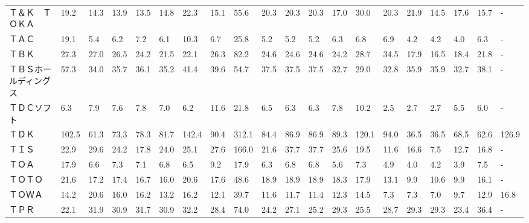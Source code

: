 \begin{tabular}{llllllllllllllllllll}
Ｔ＆Ｋ　ＴＯＫＡ        &   19.2 &   14.3 &      13.9 &      13.5 &       14.8 &    22.3 &    15.1 &     55.6 &    20.3 &    20.3 &   20.3 &   17.0 &    30.0 &    20.3 &    21.9 &   14.5 &   17.6 &    15.7 &      - \\
ＴＡＣ             &   19.1 &    5.4 &       6.2 &       7.2 &        6.1 &    10.3 &     6.7 &     25.8 &     5.2 &     5.2 &    5.2 &    6.3 &     6.8 &     6.9 &     4.2 &    4.2 &    4.0 &     6.3 &      - \\
ＴＢＫ             &   27.3 &   27.0 &      26.5 &      24.2 &       21.5 &    22.1 &    26.3 &     82.2 &    24.6 &    24.6 &   24.6 &   24.2 &    28.7 &    34.5 &    17.9 &   16.5 &   18.4 &    21.8 &      - \\
ＴＢＳホールディングス     &   57.3 &   34.0 &      35.7 &      36.1 &       35.2 &    41.4 &    39.6 &     54.7 &    37.5 &    37.5 &   37.5 &   32.7 &    29.0 &    32.8 &    35.9 &   35.9 &   32.7 &    38.1 &      - \\
ＴＤＣソフト          &    6.3 &    7.9 &       7.6 &       7.8 &        7.0 &     6.2 &    11.6 &     21.8 &     6.5 &     6.3 &    6.3 &    7.8 &    10.2 &     2.5 &     2.7 &    2.7 &    5.5 &     6.0 &      - \\
ＴＤＫ             &  102.5 &   61.3 &      73.3 &      78.3 &       81.7 &   142.4 &    90.4 &    312.1 &    84.4 &    86.9 &   86.9 &   89.3 &   120.1 &    94.0 &    36.5 &   36.5 &   68.5 &    62.6 &  126.9 \\
ＴＩＳ             &   22.9 &   29.6 &      24.2 &      17.8 &       24.0 &    25.1 &    27.6 &    166.0 &    21.6 &    37.7 &   37.7 &   25.6 &    19.5 &    11.6 &    16.6 &    7.5 &   12.7 &    16.8 &      - \\
ＴＯＡ             &   17.9 &    6.6 &       7.3 &       7.1 &        6.8 &     6.5 &     9.2 &     17.9 &     6.3 &     6.8 &    6.8 &    5.6 &     7.3 &     4.9 &     4.0 &    4.2 &    3.9 &     7.5 &      - \\
ＴＯＴＯ            &   21.6 &   17.2 &      17.4 &      16.7 &       16.0 &    20.6 &    17.6 &     48.6 &    18.9 &    18.9 &   18.9 &   18.3 &    17.9 &    13.1 &     9.9 &   10.6 &    9.9 &    16.1 &      - \\
ＴＯＷＡ            &   14.2 &   20.6 &      16.0 &      16.2 &       13.2 &    16.2 &    12.1 &     39.7 &    11.6 &    11.7 &   11.4 &   12.3 &    14.5 &     7.3 &     7.3 &    7.0 &    9.7 &    12.9 &   16.8 \\
ＴＰＲ             &   22.1 &   31.9 &      30.9 &      31.7 &       30.9 &    32.2 &    28.4 &     74.0 &    24.2 &    27.1 &   25.2 &   29.3 &    25.5 &    28.7 &    29.3 &   29.3 &   23.4 &    36.4 &      - \\

\end{tabular}
